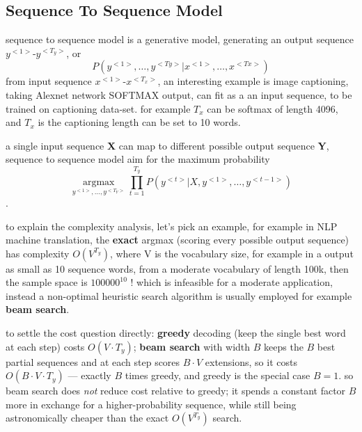 \documentclass[4apaper,12pt]{book}
\begin{document}
\begin{description}
    \section{Sequence To Sequence Model}
    \begin{description}
    \item sequence to sequence model is a generative model, generating an output sequence $y^{<1>}\text{-}y^{<T_y>}$, or $$P(y^{<1>},\dots,y^{<Ty>}|x^{<1>},\dots,x^{<Tx>})$$ from input sequence $x^{<1>}\text{-}x^{<T_x>}$, an interesting example is image captioning, taking Alexnet network SOFTMAX output, can fit as a an input sequence, to be trained on captioning data-set. for example $T_x$ can be softmax of length 4096, and $T_x$ is the captioning length can be set to 10 words.
    \item a single input sequence \textbf{X} can map to different possible output sequence \textbf{Y}, sequence to sequence model aim for the maximum probability $$\underset{y^{<1>},\dots,y^{<T_Y>}}{\operatorname{argmax}}\prod_{t=1}^{T_y}P(y^{<t>}|X,y^{<1>},\dots,y^{<t-1>})$$.
    \item to explain the complexity analysis, let's pick an example, for example in NLP machine translation, the \textbf{exact} argmax (scoring every possible output sequence) has complexity $O(V^{T_y})$, where V is the vocabulary size, for example in a output as small as 10 sequence words, from a moderate vocabulary of length 100k, then the sample space is $100000^{10}$ ! which is infeasible for a moderate application, instead a non-optimal heuristic search algorithm is usually employed for example  \textbf{beam search}.
    \item to settle the cost question directly: \textbf{greedy} decoding (keep the single best word at each step) costs $O(V\cdot T_y)$; \textbf{beam search} with width $B$ keeps the $B$ best partial sequences and at each step scores $B\cdot V$ extensions, so it costs $O(B\cdot V\cdot T_y)$ --- exactly $B$ times greedy, and greedy is the special case $B=1$. so beam search does \emph{not} reduce cost relative to greedy; it spends a constant factor $B$ more in exchange for a higher-probability sequence, while still being astronomically cheaper than the exact $O(V^{T_y})$ search.

\end{description}
\end{description}
\end{document}

